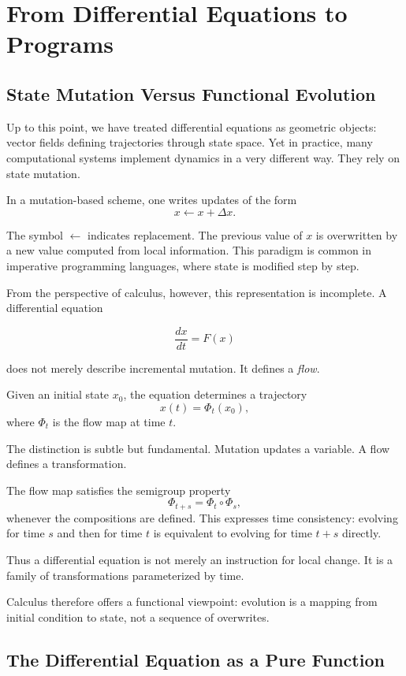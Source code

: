 \documentclass[12pt]{book}
\begin{document}
\chapter{From Differential Equations to Programs}

\section{State Mutation Versus Functional Evolution}

Up to this point, we have treated differential equations as geometric objects: vector fields defining trajectories through state space. Yet in practice, many computational systems implement dynamics in a very different way. They rely on state mutation.

In a mutation-based scheme, one writes updates of the form
\[
x \leftarrow x + \Delta x.
\]

The symbol $\leftarrow$ indicates replacement. The previous value of $x$ is overwritten by a new value computed from local information. This paradigm is common in imperative programming languages, where state is modified step by step.

From the perspective of calculus, however, this representation is incomplete. A differential equation

\[
\frac{dx}{dt} = F(x)
\]

does not merely describe incremental mutation. It defines a \emph{flow}.

Given an initial state $x_0$, the equation determines a trajectory
\[
x(t) = \Phi_t(x_0),
\]
where $\Phi_t$ is the flow map at time $t$.

The distinction is subtle but fundamental. Mutation updates a variable. A flow defines a transformation.

The flow map satisfies the semigroup property
\[
\Phi_{t+s} = \Phi_t \circ \Phi_s,
\]
whenever the compositions are defined. This expresses time consistency: evolving for time $s$ and then for time $t$ is equivalent to evolving for time $t+s$ directly.

Thus a differential equation is not merely an instruction for local change. It is a family of transformations parameterized by time.

Calculus therefore offers a functional viewpoint: evolution is a mapping from initial condition to state, not a sequence of overwrites.

\section{The Differential Equation as a Pure Function}
\end{document}
